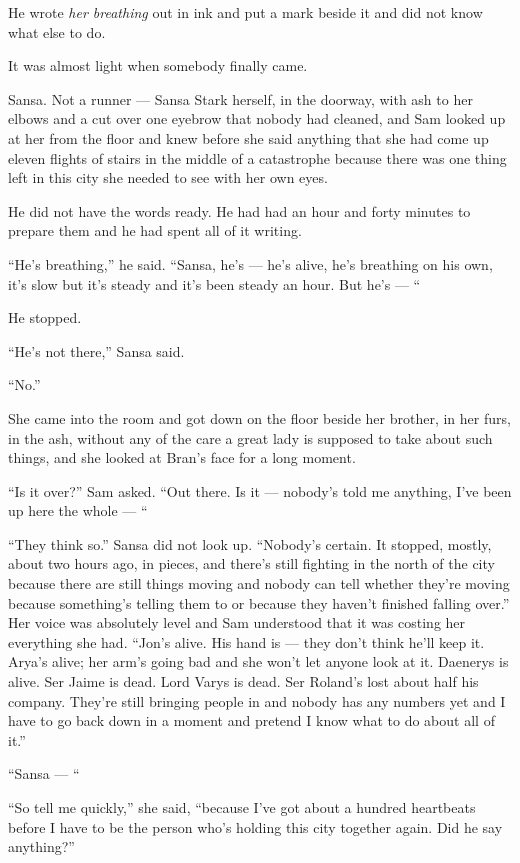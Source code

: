 He wrote \textit{her breathing} out in ink and put a mark beside it and did not know what else to do.

\sceneBreak

It was almost light when somebody finally came.

Sansa. Not a runner — Sansa Stark herself, in the doorway, with ash to her elbows and a cut over one eyebrow that nobody had cleaned, and Sam looked up at her from the floor and knew before she said anything that she had come up eleven flights of stairs in the middle of a catastrophe because there was one thing left in this city she needed to see with her own eyes.

He did not have the words ready. He had had an hour and forty minutes to prepare them and he had spent all of it writing.

“He’s breathing,” he said. “Sansa, he’s — he’s alive, he’s breathing on his own, it’s slow but it’s steady and it’s been steady an hour. But he’s — “

He stopped.

“He’s not there,” Sansa said.

“No.”

She came into the room and got down on the floor beside her brother, in her furs, in the ash, without any of the care a great lady is supposed to take about such things, and she looked at Bran’s face for a long moment.

“Is it over?” Sam asked. “Out there. Is it — nobody’s told me anything, I’ve been up here the whole — “

“They think so.” Sansa did not look up. “Nobody’s certain. It stopped, mostly, about two hours ago, in pieces, and there’s still fighting in the north of the city because there are still things moving and nobody can tell whether they’re moving because something’s telling them to or because they haven’t finished falling over.” Her voice was absolutely level and Sam understood that it was costing her everything she had. “Jon’s alive. His hand is — they don’t think he’ll keep it. Arya’s alive; her arm’s going bad and she won’t let anyone look at it. Daenerys is alive. Ser Jaime is dead. Lord Varys is dead. Ser Roland’s lost about half his company. They’re still bringing people in and nobody has any numbers yet and I have to go back down in a moment and pretend I know what to do about all of it.”

“Sansa — “

“So tell me quickly,” she said, “because I’ve got about a hundred heartbeats before I have to be the person who’s holding this city together again. Did he say anything?”

